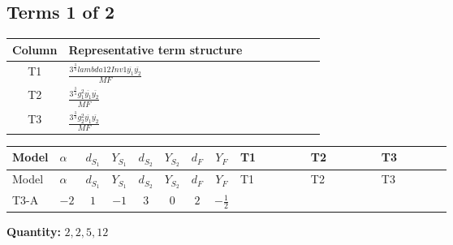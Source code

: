 \documentclass[8pt]{article}
\begin{document}
\begin{landscape}
\subsection*{Terms 1 of 2}
\begin{center}
\begin{tabular}{@{}c >{\raggedright\arraybackslash}p{0.82\linewidth}@{}}
\toprule
Column & Representative term structure \\
\midrule
T1 & \(\displaystyle \frac{3^{\frac{3}{4}} lambda12Inv1 \overline{y_{1}} \overline{y_{2}}}{MF}\) \\
\midrule
T2 & \(\displaystyle \frac{3^{\frac{3}{4}} g_{1}^{2} \overline{y_{1}} \overline{y_{2}}}{MF}\) \\
\midrule
T3 & \(\displaystyle \frac{3^{\frac{3}{4}} g_{2}^{2} \overline{y_{1}} \overline{y_{2}}}{MF}\) \\
\midrule
\bottomrule
\end{tabular}
\end{center}
\smallskip
\tiny
\begin{longtable}{@{}llcccccc >{\raggedright\arraybackslash}p{0.21\linewidth} >{\raggedright\arraybackslash}p{0.21\linewidth} >{\raggedright\arraybackslash}p{0.21\linewidth}@{}}
\toprule
Model & $\alpha$ & $d_{S_1}$ & $Y_{S_1}$ & $d_{S_2}$ & $Y_{S_2}$ & $d_F$ & $Y_F$ & T1 & T2 & T3 \\
\midrule
\endfirsthead
\toprule
Model & $\alpha$ & $d_{S_1}$ & $Y_{S_1}$ & $d_{S_2}$ & $Y_{S_2}$ & $d_F$ & $Y_F$ & T1 & T2 & T3 \\
\midrule
\endhead
T3-A & $-2$ & $1$ & $-1$ & $3$ & $0$ & $2$ & $-\frac{1}{2}$ & \scriptsize\adjustbox{max width=\linewidth}{$\begin{gathered} \frac{3^{\frac{3}{4}} lambda12Inv1 \overline{y_{1}} \overline{y_{2}}}{6 MF}\end{gathered}$} & \scriptsize\adjustbox{max width=\linewidth}{$\begin{gathered} \frac{3^{\frac{3}{4}} g_{1}^{2} \overline{y_{1}} \overline{y_{2}}}{8 MF}\end{gathered}$} & \scriptsize\adjustbox{max width=\linewidth}{$\begin{gathered} \frac{11 \cdot 3^{\frac{3}{4}} g_{2}^{2} \overline{y_{1}} \overline{y_{2}}}{8 MF}\end{gathered}$} \\
\midrule
\bottomrule
\end{longtable}
\clearpage
\noindent\textbf{Quantity: }$\mathrm{2,2,5,12}$\par\smallskip

\end{landscape}
\end{document}
